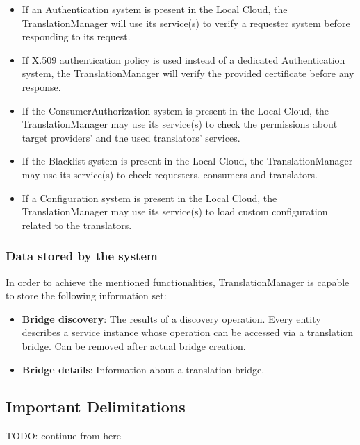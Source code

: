 \documentclass[a4paper]{arrowhead}
\begin{document}
\begin{itemize}
    \item If an Authentication system is present in the Local Cloud, the TranslationManager will use its service(s) to verify a requester system before responding to its request.
    \item If X.509 authentication policy is used instead of a dedicated Authentication system, the TranslationManager will verify the provided certificate before any response.
    \item If the ConsumerAuthorization system is present in the Local Cloud, the TranslationManager may use its service(s) to check the permissions about target providers' and the used translators' services.
    \item If the Blacklist system is present in the Local Cloud, the TranslationManager may use its service(s) to check requesters, consumers and translators.
    \item If a Configuration system is present in the Local Cloud, the TranslationManager may use its service(s) to load custom configuration related to the translators.
\end{itemize}
 

\subsubsection {Data stored by the system}
In order to achieve the mentioned functionalities, TranslationManager is capable to store the following information set:

\begin{itemize}
    \item \textbf{Bridge discovery}: The results of a discovery operation. Every entity describes a service instance whose operation can be accessed via a translation bridge. Can be removed after actual bridge creation.
    \item \textbf{Bridge details}: Information about a translation bridge.
\end{itemize}

\subsection{Important Delimitations}
\label{sec:delimitations}

TODO: continue from here
\end{document}
